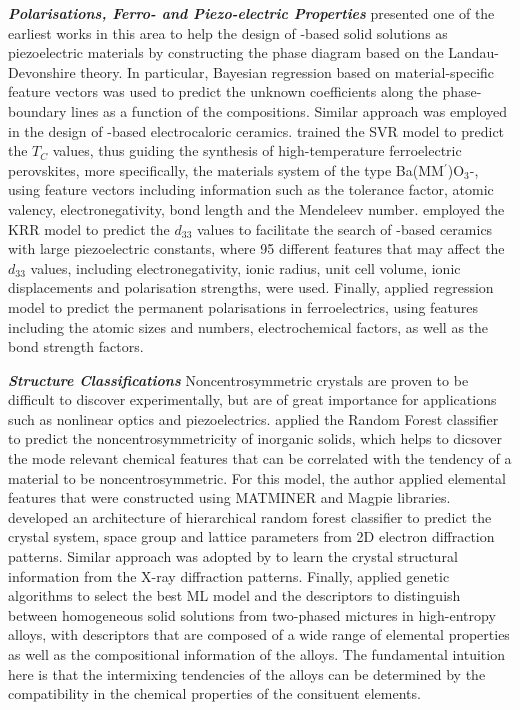 \textbf{\textit{Polarisations, Ferro- and Piezo-electric Properties}} \citet{xue2016accelerated} presented one of the earliest works in this area to help the design of -based solid solutions as piezoelectric materials by constructing the phase diagram based on the Landau-Devonshire theory. In particular, Bayesian regression based on material-specific feature vectors was used to predict the unknown coefficients along the phase-boundary lines as a function of the compositions. Similar approach was employed in the design of -based electrocaloric ceramics.\cite{yuan2022optimizing}
\citet{balachandran2018experimental} trained the SVR model to predict the $T_C$ values, thus guiding the synthesis of high-temperature ferroelectric perovskites, more specifically, the materials system of the type Ba(MM$^\prime$)O$_3$-, using feature vectors including information such as the tolerance factor, atomic valency, electronegativity, bond length and the Mendeleev number. 
\citet{yuan2022machine} employed the KRR model to predict the $d_{33}$ values to facilitate the search of -based ceramics with large piezoelectric constants, where 95 different features that may affect the  $d_{33}$ values, including electronegativity, ionic radius, unit cell volume, ionic displacements and polarisation strengths, were used.\cite{yuan2018accelerated,yuan2019accelerated}
Finally, \citet{he2021machine} applied regression model to predict the permanent polarisations in ferroelectrics, using features including the atomic sizes and numbers, electrochemical factors, as well as the bond strength factors.

\textbf{\textit{Structure Classifications}}  Noncentrosymmetric crystals are proven to be difficult to discover experimentally, but are of great importance for applications such as nonlinear optics and piezoelectrics. \citet{song2020machine} applied the Random Forest classifier to predict the noncentrosymmetricity of inorganic solids, which helps to dicsover the mode relevant chemical features that can be correlated with the tendency of a material to be noncentrosymmetric. For this model, the author applied elemental features that were constructed using MATMINER\cite{ward2018matminer} and Magpie\cite{ward2016general} libraries. \citet{gleason2024random} developed an architecture of hierarchical random forest classifier to predict the crystal system, space group and lattice parameters from 2D electron diffraction patterns. Similar approach was adopted by \citet{corriero2023crystalmela} to learn the crystal structural information from the X-ray diffraction patterns. Finally, \citet{zhang2020phase} applied genetic algorithms to select the best ML model and the descriptors to distinguish between homogeneous solid solutions from two-phased mictures in high-entropy alloys, with descriptors that are composed of a wide range of elemental properties as well as the compositional information of the alloys. The fundamental intuition here is that the intermixing tendencies of the alloys can be determined by the compatibility in the chemical properties of the consituent elements. 

